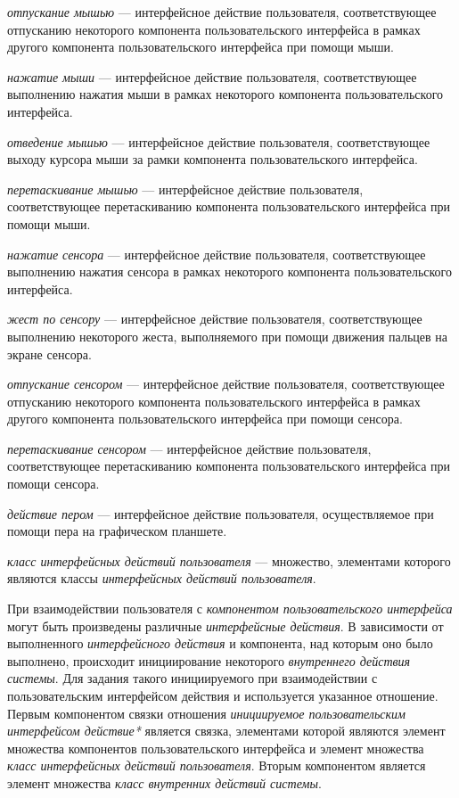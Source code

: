 \textit{отпускание мышью} --- интерфейсное действие пользователя, соответствующее отпусканию некоторого компонента пользовательского интерфейса в рамках другого компонента пользовательского интерфейса при помощи мыши.

\textit{нажатие мыши} --- интерфейсное действие пользователя, соответствующее выполнению нажатия мыши в рамках некоторого компонента пользовательского интерфейса.

\textit{отведение мышью} --- интерфейсное действие пользователя, соответствующее выходу курсора мыши за рамки компонента пользовательского интерфейса.

\textit{перетаскивание мышью} --- интерфейсное действие пользователя, соответствующее перетаскиванию компонента пользовательского интерфейса при помощи мыши.

\textit{нажатие сенсора} --- интерфейсное действие пользователя, соответствующее выполнению нажатия сенсора в рамках некоторого компонента пользовательского интерфейса.

\textit{жест по сенсору} --- интерфейсное действие пользователя, соответствующее выполнению некоторого жеста, выполняемого при помощи движения пальцев на экране сенсора.

\textit{отпускание сенсором} --- интерфейсное действие пользователя, соответствующее отпусканию некоторого компонента пользовательского интерфейса в рамках другого компонента пользовательского интерфейса при помощи сенсора.

\textit{перетаскивание сенсором} --- интерфейсное действие пользователя, соответствующее перетаскиванию компонента пользовательского интерфейса при помощи сенсора.

\textit{действие пером} --- интерфейсное действие пользователя, осуществляемое при помощи пера на графическом планшете.

\textit{класс интерфейсных действий пользователя} --- множество, элементами которого являются классы \textit{интерфейсных действий пользователя}.

При взаимодействии пользователя с \textit{компонентом пользовательского интерфейса} могут быть произведены различные \textit{интерфейсные действия}. В зависимости от выполненного \textit{интерфейсного действия} и компонента, над которым оно было выполнено, происходит инициирование некоторого \textit{внутреннего действия системы}. Для задания такого инициируемого при взаимодействии с пользовательским интерфейсом действия и используется указанное отношение. Первым компонентом связки отношения \textit{инициируемое пользовательским интерфейсом действие*} является связка, элементами которой являются элемент множества компонентов пользовательского интерфейса и элемент множества \textit{класс интерфейсных действий пользователя}. Вторым компонентом является элемент множества \textit{класс внутренних действий системы}.


